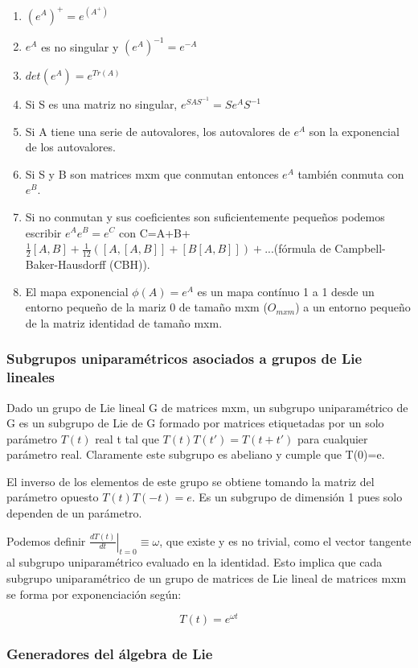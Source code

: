 \begin{enumerate}
\item $(e^A)^+=e^{(A^+)}$
\item $e^A$ es no singular y $(e^A)^{-1}=e^{-A}$
\item $det(e^{A}) = e^{Tr(A)}$
\item Si S es una matriz no singular, $e^{SAS^{-1}}=Se^{A}S^{-1}$
\item Si A tiene una serie de autovalores, los autovalores de $e^{A}$ son la exponencial de los autovalores.
\item Si S y B son matrices mxm que conmutan entonces $e^{A}$ también conmuta con $e^B$.
\item Si no conmutan y sus coeficientes son suficientemente pequeños podemos escribir $e^Ae^B=e^C$ con C=A+B+$\frac{1}{2}[A,B]+\frac{1}{12}([A,[A,B]]+[B[A,B]])+... $(fórmula de Campbell-Baker-Hausdorff (CBH)).
\item El mapa exponencial $\phi (A)=e^A$ es un mapa contínuo 1 a 1 desde un entorno pequeño de la mariz 0 de tamaño mxm ($O_{mxm}$) a un entorno pequeño de la matriz identidad de tamaño mxm.
\end{enumerate}

\subsubsection{Subgrupos uniparamétricos asociados a grupos de Lie lineales}

Dado un grupo de Lie lineal G de matrices mxm, un subgrupo uniparamétrico de G es un subgrupo de Lie de G formado por matrices etiquetadas por un solo parámetro $T(t)$ real t tal que $T(t)T(t')=T(t+t')$ para cualquier parámetro real. Claramente este subgrupo es abeliano y cumple que T(0)=e.

\smallskip
El inverso de los elementos de este grupo se obtiene tomando la matriz del parámetro opuesto $T(t)T(-t)=e$. Es un subgrupo de dimensión 1 pues solo dependen de un parámetro.

\smallskip
Podemos definir $\left . \frac{dT(t)}{dt}\right |_{t=0}\equiv \omega$, que existe y es no trivial, como el vector tangente al subgrupo uniparamétrico evaluado en la identidad. Esto implica que cada subgrupo uniparamétrico de un grupo de matrices de Lie lineal de matrices mxm se forma por exponenciación según:

$$T(t)=e^{\omega t}$$

\subsubsection{Generadores del álgebra de Lie}


